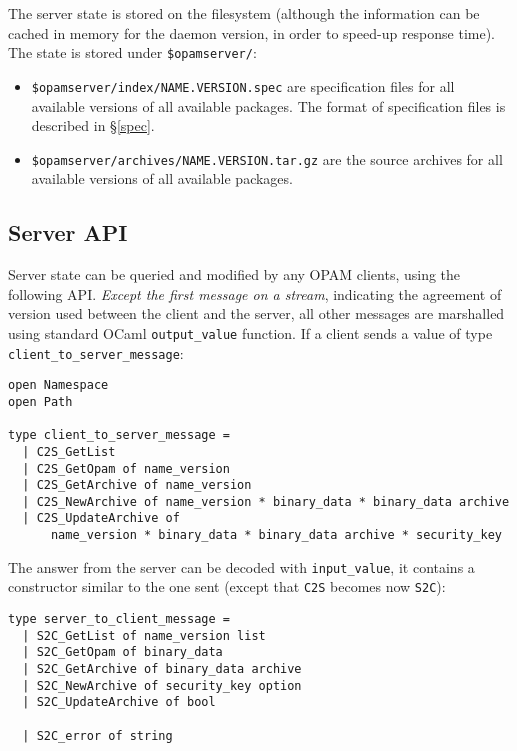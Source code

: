 \documentclass[a4paper,11pt]{article}
\begin{document}
The server state is stored on the filesystem (although the information
can be cached in memory for the daemon version, in order to speed-up
response time). The state is stored under {\tt \$opamserver/}:

\begin{itemize}

\item {\tt \$opamserver/index/NAME.VERSION.spec} are specification files
  for all available versions of all available packages. The format of
  specification files is described in \S\ref{spec}.

\item {\tt \$opamserver/archives/NAME.VERSION.tar.gz} are the
  source archives for all available versions of all available
  packages.

\end{itemize}

\subsection{Server API}
\label{api}

Server state can be queried and modified by any OPAM clients, using
the following API. {\em Except the first message on a stream},
indicating the agreement of version used between the client and 
the server, all
other messages are marshalled using standard OCaml \verb-output_value-
function.
If a client sends a value of type \verb|client_to_server_message|:

\begin{verbatim}
open Namespace
open Path

type client_to_server_message =
  | C2S_GetList
  | C2S_GetOpam of name_version
  | C2S_GetArchive of name_version
  | C2S_NewArchive of name_version * binary_data * binary_data archive
  | C2S_UpdateArchive of 
      name_version * binary_data * binary_data archive * security_key
\end{verbatim}

The answer from the server can be decoded with \verb|input_value|, 
it contains a constructor similar to the one sent 
(except that \verb|C2S| becomes now \verb|S2C|):

\begin{verbatim}
type server_to_client_message =
  | S2C_GetList of name_version list
  | S2C_GetOpam of binary_data
  | S2C_GetArchive of binary_data archive
  | S2C_NewArchive of security_key option
  | S2C_UpdateArchive of bool

  | S2C_error of string
\end{verbatim}
\end{document}
